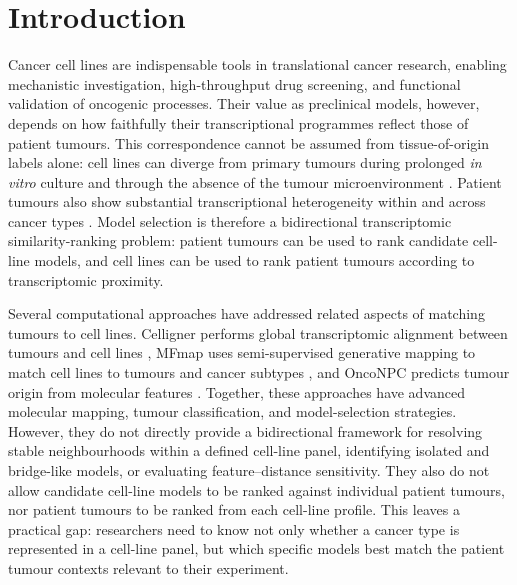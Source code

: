 \section{Introduction}

Cancer cell lines are indispensable tools in translational cancer research, enabling mechanistic investigation, high-throughput drug screening, and functional validation of oncogenic processes. Their value as preclinical models, however, depends on how faithfully their transcriptional programmes reflect those of patient tumours. This correspondence cannot be assumed from tissue-of-origin labels alone: cell lines can diverge from primary tumours during prolonged \textit{in vitro} culture and through the absence of the tumour microenvironment \citep{Bose2024,Mirabelli2019CancerCellLines,BenDavid2018}. Patient tumours also show substantial transcriptional heterogeneity within and across cancer types \citep{PanCancerWholeGenome2020}. Model selection is therefore a bidirectional transcriptomic similarity-ranking problem: patient tumours can be used to rank candidate cell-line models, and cell lines can be used to rank patient tumours according to transcriptomic proximity.

Several computational approaches have addressed related aspects of matching tumours to cell lines. Celligner performs global transcriptomic alignment between tumours and cell lines \citep{Warren2021GlobalAlignment}, MFmap uses semi-supervised generative mapping to match cell lines to tumours and cancer subtypes \citep{Zhang2021MFmap}, and OncoNPC predicts tumour origin from molecular features \citep{Moon2023CUP}. Together, these approaches have advanced molecular mapping, tumour classification, and model-selection strategies. However, they do not directly provide a bidirectional framework for resolving stable neighbourhoods within a defined cell-line panel, identifying isolated and bridge-like models, or evaluating feature--distance sensitivity. They also do not allow candidate cell-line models to be ranked against individual patient tumours, nor patient tumours to be ranked from each cell-line profile. This leaves a practical gap: researchers need to know not only whether a cancer type is represented in a cell-line panel, but which specific models best match the patient tumour contexts relevant to their experiment.

